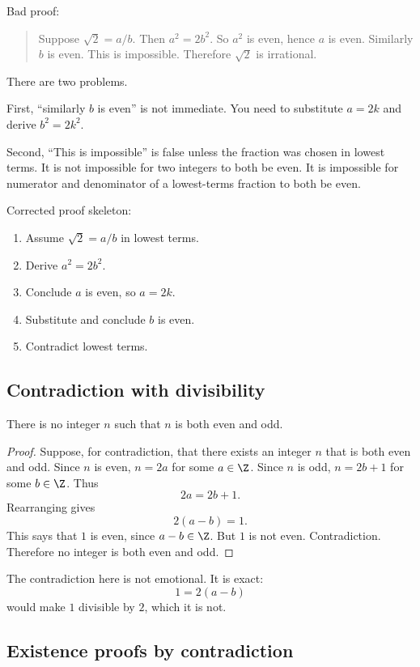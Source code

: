 Bad proof:

\begin{quote}
Suppose $\sqrt2=a/b$. Then $a^2=2b^2$. So $a^2$ is even, hence $a$ is even. Similarly $b$ is even. This is impossible. Therefore $\sqrt2$ is irrational.
\end{quote}

There are two problems.

First, ``similarly $b$ is even'' is not immediate. You need to substitute $a=2k$ and derive $b^2=2k^2$.

Second, ``This is impossible'' is false unless the fraction was chosen in lowest terms. It is not impossible for two integers to both be even. It is impossible for numerator and denominator of a lowest-terms fraction to both be even.

Corrected proof skeleton:

\begin{enumerate}
\item Assume $\sqrt2=a/b$ in lowest terms.
\item Derive $a^2=2b^2$.
\item Conclude $a$ is even, so $a=2k$.
\item Substitute and conclude $b$ is even.
\item Contradict lowest terms.
\end{enumerate}

\subsection{Contradiction with divisibility}

\begin{theorem}
There is no integer $n$ such that $n$ is both even and odd.
\end{theorem}

\begin{proof}
Suppose, for contradiction, that there exists an integer $n$ that is both even and odd. Since $n$ is even, $n=2a$ for some $a\in\Z$. Since $n$ is odd, $n=2b+1$ for some $b\in\Z$. Thus
\[
2a=2b+1.
\]
Rearranging gives
\[
2(a-b)=1.
\]
This says that $1$ is even, since $a-b\in\Z$. But $1$ is not even. Contradiction. Therefore no integer is both even and odd.
\end{proof}

The contradiction here is not emotional. It is exact:
\[
1=2(a-b)
\]
would make $1$ divisible by $2$, which it is not.

\subsection{Existence proofs by contradiction}

